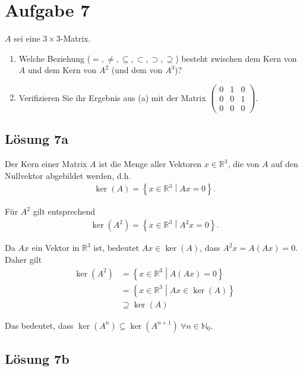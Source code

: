 \documentclass[main.tex]{subfiles}
\begin{document}
\section{Aufgabe 7}
$A$ sei eine $3 \times 3$-Matrix.
\begin{enumerate}
    \item Welche Beziehung ($=,\neq, \subseteq, \subset, \supset, \supseteq$) besteht zwischen dem Kern von $A$ und dem Kern von $A^2$ (und dem von $A^3$)?
    \item Verifizieren Sie ihr Ergebnis aus (a) mit der Matrix $\begin{pmatrix}
        0 & 1 & 0 \\
        0 & 0 & 1 \\
        0 & 0 & 0
    \end{pmatrix}$.
\end{enumerate}

\subsection{Lösung 7a}
Der Kern einer Matrix $A$ ist die Menge aller Vektoren $x \in \mathbb{R}^3$, die von $A$ auf den Nullvektor abgebildet werden, d.h.
\begin{align*}
    \ker \left(A\right) = \left\{ x\in \mathbb{R}^3 \middle| Ax=0 \right\}.
\end{align*}

Für $A^2$ gilt entsprechend
\begin{align*}
    \ker \left(A^2\right) = \left\{ x\in \mathbb{R}^3 \middle| A^2x=0 \right\}.
\end{align*}

Da $Ax$ ein Vektor in $\mathbb{R}^3$ ist, bedeutet $Ax \in \operatorname{ker}(A)$, dass $A^2x = A(Ax) = 0$.
Daher gilt
\begin{align*}
    \ker \left(A^2\right) &= \left\{ x\in \mathbb{R}^3 \middle| A(Ax)=0 \right\} \\
                          &= \left\{ x\in \mathbb{R}^3 \middle| Ax \in \ker \left(A\right) \right\} \\
                          &\supseteq \ker \left(A\right)
\end{align*}

Das bedeutet, dass $\ker \left(A^n\right) \subseteq \ker \left(A^{n+1}\right)\ \forall n \in \mathbb{N}_0$.

\subsection{Lösung 7b}
\end{document}
